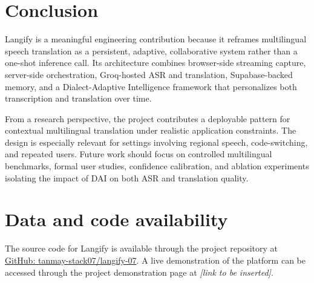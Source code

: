 \documentclass[twocolumn]{svjour3}
\begin{document}
\section{Conclusion}
\label{sec:conclusion}
Langify is a meaningful engineering contribution because it reframes multilingual speech translation as a persistent, adaptive, collaborative system rather than a one-shot inference call. Its architecture combines browser-side streaming capture, server-side orchestration, Groq-hosted ASR and translation, Supabase-backed memory, and a Dialect-Adaptive Intelligence framework that personalizes both transcription and translation over time.

From a research perspective, the project contributes a deployable pattern for contextual multilingual translation under realistic application constraints. The design is especially relevant for settings involving regional speech, code-switching, and repeated users. Future work should focus on controlled multilingual benchmarks, formal user studies, confidence calibration, and ablation experiments isolating the impact of DAI on both ASR and translation quality.

\section{Data and code availability}
\label{sec:availability}
The source code for Langify is available through the project repository at \href{https://github.com/tanmay-stack07/langify-07/}{GitHub: tanmay-stack07/langify-07}. A live demonstration of the platform can be accessed through the project demonstration page at \emph{[link to be inserted]}.
\end{document}

